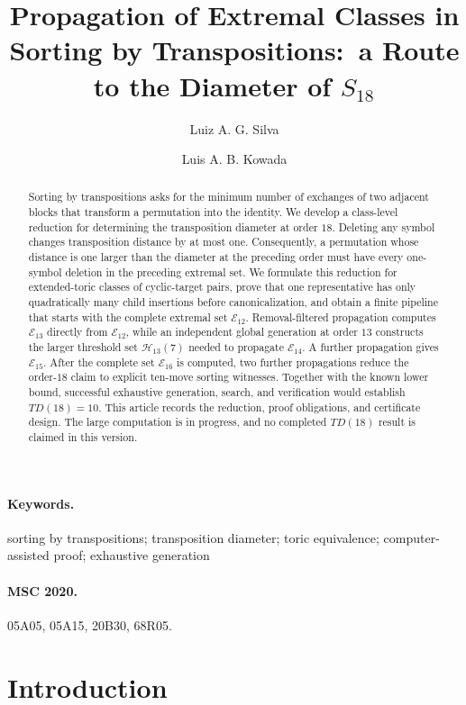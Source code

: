 \documentclass[11pt]{article}
\title{Propagation of Extremal Classes in Sorting by Transpositions:\
  a Route to the Diameter of $S_{18}$}
\author{Luiz A. G. Silva \and Luis A. B. Kowada}
\date{}
\theoremstyle{definition}
\theoremstyle{remark}
\newcommand{\En}{\mathcal E}
\newcommand{\Hn}{\mathcal H}
\begin{document}
\maketitle

\begin{abstract}
Sorting by transpositions asks for the minimum number of exchanges of two
adjacent blocks that transform a permutation into the identity.  We develop a
class-level reduction for determining the transposition diameter at order
$18$.  Deleting any symbol changes transposition distance by at most one.
Consequently, a permutation whose distance is one larger than the diameter at
the preceding order must have every one-symbol deletion in the preceding
extremal set.  We formulate this reduction for extended-toric classes of
cyclic-target pairs, prove that one representative has only quadratically many
child insertions before canonicalization, and obtain a finite pipeline that
starts with the complete extremal set $\En_{12}$.  Removal-filtered
propagation computes $\En_{13}$ directly from $\En_{12}$, while an independent
global generation at order $13$ constructs the larger threshold set
$\Hn_{13}(7)$ needed to propagate $\En_{14}$.  A further propagation gives
$\En_{15}$.  After the complete set $\En_{16}$ is computed, two further
propagations reduce the order-$18$ claim to explicit ten-move sorting
witnesses.  Together with the known lower bound, successful exhaustive
generation, search, and verification would establish $TD(18)=10$.  This
article records the reduction, proof obligations, and certificate design.
The large computation is in progress, and no completed $TD(18)$ result is
claimed in this version.
\end{abstract}

\paragraph{Keywords.}
sorting by transpositions; transposition diameter; toric equivalence;\newline
computer-assisted proof; exhaustive generation

\paragraph{MSC 2020.}
05A05, 05A15, 20B30, 68R05.

\section{Introduction}\label{sec:introduction}
\end{document}
